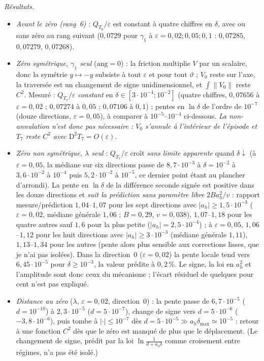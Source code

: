 \documentclass[11pt,a4paper]{article}
\theoremstyle{remark}
\theoremstyle{definition}
\newcommand{\norm}[1]{\lVert #1\rVert}
\newcommand{\eps}{\varepsilon}
\newcommand{\vth}{\vartheta}
\newcommand{\D}{\mathrm D}
\begin{document}
\emph{Résultats.}
\begin{itemize}[nosep]
\item \emph{Avant le zéro (rang~6)} : $Q_{T_6}/\eps$ est constant à quatre chiffres en $\delta$, avec ou sans zéro au rang suivant ($0{,}0729$ pour $\gamma_1$ à $\eps=0{,}02;0{,}05;0{,}1$ : $0{,}07285$, $0{,}07279$, $0{,}07268$).
\item \emph{Zéro symétrique, $\gamma_1$ seul} ($\mathrm{ang}=0$) : la friction multiplie $V$ par un scalaire, donc la symétrie $y\mapsto-y$ subsiste à tout $\eps$ et pour tout $\vth$ ; $V_0$ reste sur l'axe, la traversée est un changement de signe unidimensionnel, et $\int\norm{V_0}$ reste $C^2$. Mesuré : $Q_{T_7}/\eps$ \emph{constant} en $\delta\in[3\cdot10^{-4};10^{-2}]$ (quatre chiffres, $0{,}07656$ à $\eps=0{,}02$ ; $0{,}07274$ à $0{,}05$ ; $0{,}07106$ à $0{,}1$) ; pentes en $\ln\delta$ de l'ordre de $10^{-7}$ (douze directions, $\eps=0{,}05$), à comparer à $10^{-5}$--$10^{-4}$ ci-dessous. \emph{La non-annulation n'est donc pas nécessaire : $V_0$ s'annule à l'intérieur de l'épisode et $T_7$ reste $C^2$ avec $\D^2T_7=O(\eps)$.}
\item \emph{Zéro non symétrique, $\lambda$ seul} : $Q_{T_7}/\eps$ croît \emph{sans limite apparente} quand $\delta\downarrow$ (à $\eps=0{,}05$, la médiane sur six directions passe de $8{,}7\cdot10^{-3}$ à $\delta=10^{-2}$ à $3{,}6\cdot10^{-2}$ à $10^{-4}$ puis $5{,}2\cdot10^{-2}$ à $10^{-5}$, ce dernier point étant au plancher d'arrondi). La pente en $\ln\delta$ de la différence seconde signée est positive dans les douze directions et \emph{suit la prédiction sans paramètre libre} $2Ba_h^2/v$ : rapport mesure/prédiction $1{,}04$--$1{,}07$ pour les sept directions avec $\lvert a_h\rvert\ge1{,}5\cdot10^{-3}$ ($\eps=0{,}02$, médiane générale $1{,}06$ ; $B=0{,}29$, $v=0{,}038$), $1{,}07$--$1{,}18$ pour les quatre autres sauf $1{,}6$ pour la plus petite ($\lvert a_h\rvert=2{,}5\cdot10^{-4}$) ; à $\eps=0{,}05$, $1{,}06$--$1{,}12$ pour les huit directions avec $\lvert a_h\rvert\ge3\cdot10^{-3}$ (médiane générale $1{,}11$), $1{,}13$--$1{,}34$ pour les autres (pente alors plus sensible aux corrections lisses, que je n'ai pas isolées). Dans la direction~0 ($\eps=0{,}02$) la pente locale tend vers $6{,}45\cdot10^{-5}$ pour $\delta\ge10^{-3}$, la valeur prédite à $0{,}2\,\%$. Le signe, la loi en $a_h^2$ et l'amplitude sont donc ceux du mécanisme ; l'écart résiduel de quelques pour cent n'est pas expliqué.
\item \emph{Distance au zéro} ($\lambda$, $\eps=0{,}02$, direction~0) : la pente passe de $6{,}7\cdot10^{-5}$ ($d=10^{-10}$) à $2{,}3\cdot10^{-5}$ ($d=5\cdot10^{-7}$), change de signe vers $d=5\cdot10^{-6}$ ($-3{,}8\cdot10^{-6}$), puis tombe à $\lvert\cdot\rvert\le10^{-7}$ dès $d=5\cdot10^{-5}\gg a_h\delta_{\max}\simeq10^{-5}$ : retour à une fonction $C^2$ dès que le zéro est manqué de plus que le déplacement. (Le changement de signe, prédit par la loi $\ln\frac1{d+a_h\delta}$ comme croisement entre régimes, n'a pas été isolé.)
\end{itemize}
\end{document}
